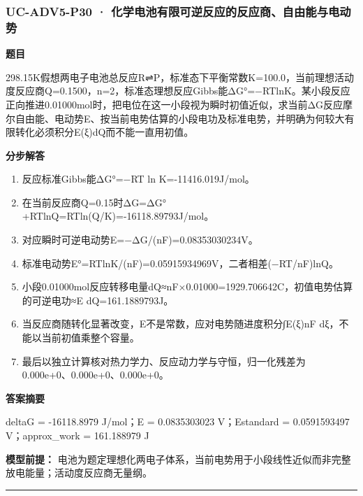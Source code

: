 \documentclass[UTF8,11pt,a4paper]{ctexart}
\begin{document}
\subsubsection*{UC-ADV5-P30 · 化学电池有限可逆反应的反应商、自由能与电动势}
\noindent\textbf{题目}\par
298.15K假想两电子电池总反应R⇌P，标准态下平衡常数K=100.0，当前理想活动度反应商Q=0.1500，n=2，标准态理想反应Gibbs能ΔG°=−RTlnK。某小段反应正向推进0.01000mol时，把电位在这一小段视为瞬时初值近似，求当前ΔG反应摩尔自由能、电动势E、按当前电势估算的小段电功及标准电势，并明确为何较大有限转化必须积分E(ξ)dQ而不能一直用初值。\par
\medskip\noindent\textbf{分步解答}
\begin{enumerate}
\item 反应标准Gibbs能ΔG°=−RT ln K=-11416.019J/mol。
\item 在当前反应商Q=0.15时ΔG=ΔG°+RTlnQ=RTln(Q/K)=-16118.89793J/mol。
\item 对应瞬时可逆电动势E=−ΔG/(nF)=0.08353030234V。
\item 标准电动势E°=RTlnK/(nF)=0.05915934969V，二者相差(−RT/nF)lnQ。
\item 小段0.01000mol反应转移电量dQ≈nF×0.01000=1929.706642C，初值电势估算的可逆电功≈E dQ=161.1889793J。
\item 当反应商随转化显著改变，E不是常数，应对电势随进度积分∫E(ξ)nF dξ，不能以当前初值乘整个容量。
\item 最后以独立计算核对热力学力、反应动力学与守恒，归一化残差为 0.000e+0、0.000e+0、0.000e+0。
\end{enumerate}
\noindent\textbf{答案摘要}\par
deltaG = -16118.8979 J/mol；E = 0.0835303023 V；Estandard = 0.0591593497 V；approx\_work = 161.188979 J\par
\noindent\textbf{模型前提：}
电池为题定理想化两电子体系，当前电势用于小段线性近似而非完整放电能量；活动度反应商无量纲。\par
\medskip\hrule\medskip
\end{document}
